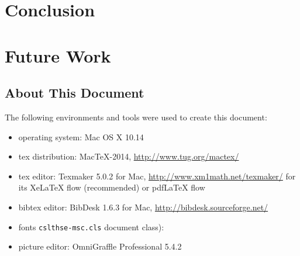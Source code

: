 \documentclass[nofilelist]{cslthse-msc}
\begin{document}
\chapter{Conclusion}

\chapter{Future Work}


{}

\begin{appendices}
\chapter{About This Document}
The following environments and tools were used to create this document:
\begin{itemize}
\item operating system: Mac OS X 10.14
\item tex distribution: MacTeX-2014, \url{http://www.tug.org/mactex/}
\item tex editor: Texmaker 5.0.2 for Mac, \url{http://www.xm1math.net/texmaker/} for its XeLaTeX flow (recommended) or pdfLaTeX flow
\item bibtex editor: BibDesk 1.6.3 for Mac, \url{http://bibdesk.sourceforge.net/}
\item fonts \texttt{cslthse-msc.cls} document class): 
\item picture editor: OmniGraffle Professional 5.4.2
\end{itemize}


\end{appendices}
\end{document}
